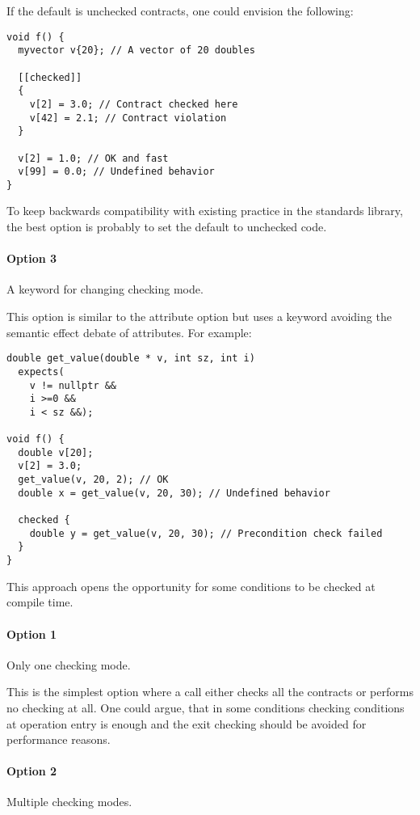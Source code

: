 If the default is unchecked contracts, one could envision the following:

\begin{lstlisting}
void f() {
  myvector v{20}; // A vector of 20 doubles
  
  [[checked]]
  {
    v[2] = 3.0; // Contract checked here
    v[42] = 2.1; // Contract violation
  }
  
  v[2] = 1.0; // OK and fast
  v[99] = 0.0; // Undefined behavior
}
\end{lstlisting}

To keep backwards compatibility with existing practice in the standards library,
the best option is probably to set the default to unchecked code.

\paragraph{Option 3} A keyword for changing checking mode.

This option is similar to the attribute option but uses a keyword avoiding the
semantic effect debate of attributes. For example:

\begin{lstlisting}
double get_value(double * v, int sz, int i)
  expects(
    v != nullptr &&
    i >=0 &&
    i < sz &&);

void f() {
  double v[20];
  v[2] = 3.0;
  get_value(v, 20, 2); // OK
  double x = get_value(v, 20, 30); // Undefined behavior

  checked {
    double y = get_value(v, 20, 30); // Precondition check failed
  }
}
\end{lstlisting}

This approach opens the opportunity for some conditions to be
checked at compile time.


\paragraph{Option 1} Only one checking mode.

This is the simplest option where a call either checks all the contracts or
performs no checking at all. One could argue, that in some conditions checking
conditions at operation entry is enough and the exit checking should be avoided
for performance reasons.

\paragraph{Option 2} Multiple checking modes.

